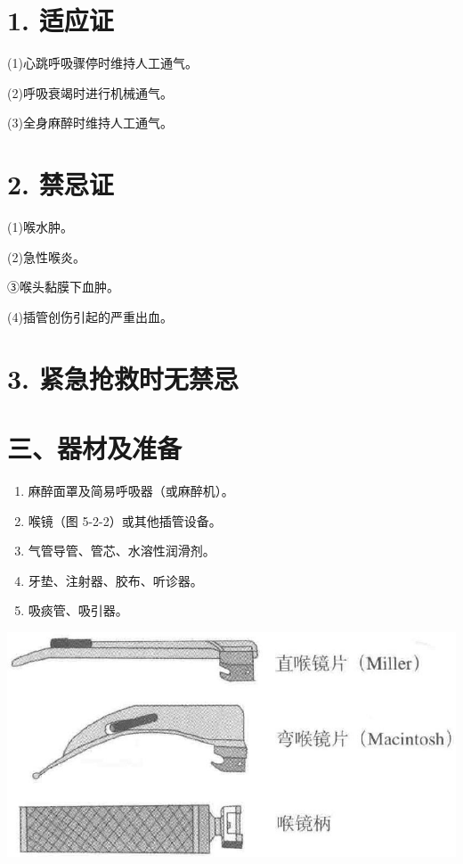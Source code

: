 \documentclass[10pt]{article}
\begin{document}
\section*{1. 适应证}
(1)心跳呼吸骤停时维持人工通气。

(2)呼吸衰竭时进行机械通气。

(3)全身麻醉时维持人工通气。

\section*{2. 禁忌证}
(1)喉水肿。

(2)急性喉炎。

③喉头黏膜下血肿。

(4)插管创伤引起的严重出血。

\section*{3. 紧急抢救时无禁忌}
\section*{三、器材及准备}
\begin{enumerate}
  \item 麻醉面罩及简易呼吸器（或麻醉机）。

  \item 喉镜（图 5-2-2）或其他插管设备。

  \item 气管导管、管芯、水溶性润滑剂。

  \item 牙垫、注射器、胶布、听诊器。

  \item 吸痰管、吸引器。

\end{enumerate}

\begin{center}
\includegraphics[max width=\textwidth]{2024_07_05_645bb794a4d4f32ee0c8g-289}
\end{center}
\end{document}
